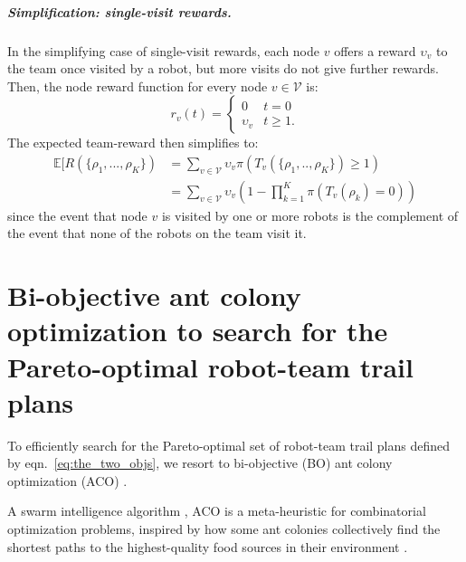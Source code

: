 \documentclass[11pt, oneside]{article}
\begin{document}
\vspace{-\baselineskip}
\subparagraph{Simplification: single-visit rewards.}
In the simplifying case of single-visit rewards, each node $v$ offers a reward $\upsilon_v$ to the team once visited by a robot, but more visits do not give further rewards. Then, the node reward function for every node $v\in\mathcal{V}$ is:
\begin{equation}
	r_v(t) = \begin{cases}
		0 & t = 0 \\
		\upsilon_v & t \geq 1.
	\end{cases}
\end{equation}The expected team-reward then simplifies to:
\begin{align}
	\mathbb{E}[R(\{\rho_1, ..., \rho_K\}) & = \sum_{v \in \mathcal{V} } \upsilon_v \pi(T_v(\{\rho_1, .., \rho_K\}) \geq 1) \\
		      & = \sum_{v \in \mathcal{V} } \upsilon_v \left(1 - \prod_{k=1}^K  \pi(T_v(\rho_k) =0) \right) 
\end{align} since the event that node $v$ is visited by one or more robots is the complement of the event that none of the robots on the team visit it.



\section{Bi-objective ant colony optimization to search for the Pareto-optimal robot-team trail plans}
To efficiently search for the Pareto-optimal set of robot-team trail plans defined by eqn.~\ref{eq:the_two_objs}, we resort to bi-objective (BO) ant colony optimization (ACO) \cite{iredi2001bi}. 

A swarm intelligence algorithm \cite{bonabeau1999swarm}, ACO \cite{dorigo2006ant} is a meta-heuristic for combinatorial optimization problems, inspired by \cite{bonabeau2000inspiration} how some ant colonies collectively find the shortest paths to the highest-quality food sources in their environment \cite{czaczkes2015trail}. 
\end{document}
